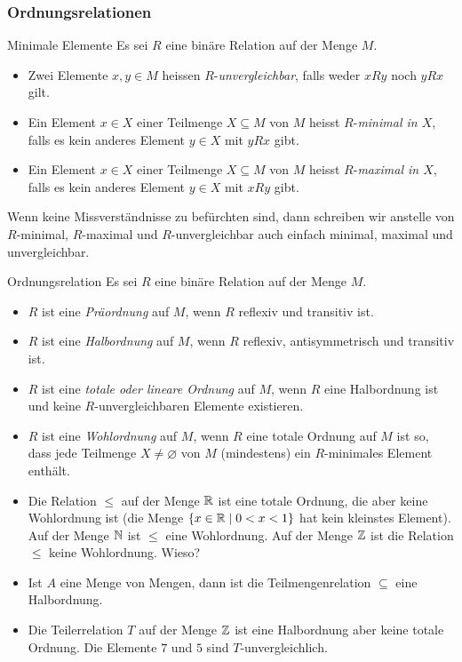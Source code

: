 \subsubsection{Ordnungsrelationen}

\begin{definition}{Minimale Elemente}
    Es sei $R$ eine binäre Relation auf der Menge $M$.
    \begin{itemize}
        \item Zwei Elemente $x,y\in M$ heissen $R$-\textit{unvergleichbar}, falls weder $xRy$ noch $yRx$ gilt.
        \item Ein Element $x\in X$ einer Teilmenge $X\subseteq M$ von $M$ heisst $R$-\textit{minimal in $X$}, falls es kein anderes Element $y\in X$ mit $yRx$ gibt.
        \item  Ein Element $x\in X$ einer Teilmenge $X\subseteq M$ von $M$ heisst $R$-\textit{maximal in $X$}, falls es kein anderes Element $y\in X$ mit $xRy$ gibt.
    \end{itemize}
    Wenn keine Missverständnisse zu befürchten sind, dann schreiben wir anstelle von $R$-minimal, $R$-maximal und $R$-unvergleichbar auch einfach minimal, maximal und unvergleichbar.
\end{definition}

\begin{definition}{Ordnungsrelation}
    Es sei $R$ eine binäre Relation auf der Menge $M$.
    \begin{itemize}
        \item $R$ ist eine \textit{Präordnung} auf $M$, wenn $R$ reflexiv und transitiv ist.
        \item $R$ ist eine \textit{Halbordnung} auf $M$, wenn $R$ reflexiv, antisymmetrisch und transitiv ist.
        \item $R$ ist eine \textit{totale oder lineare Ordnung} auf $M$, wenn $R$ eine Halbordnung ist und keine $R$-unvergleichbaren Elemente existieren.
        \item $R$ ist eine \textit{Wohlordnung} auf $M$, wenn $R$ eine totale Ordnung auf $M$ ist so, dass jede Teilmenge $X\neq\varnothing$ von $M$ (mindestens) ein $R$-minimales Element enthält.
    \end{itemize}
\end{definition}

\begin{example}
    \begin{itemize}
        \item Die Relation $\leq$ auf der Menge $\mathbb{R}$ ist eine totale Ordnung, die aber keine Wohlordnung ist (die Menge $\{x\in\mathbb{R}\mid 0<x<1\}$ hat kein kleinstes Element). Auf der Menge $\mathbb{N}$ ist $\leq$ eine Wohlordnung. Auf der Menge $\mathbb{Z}$ ist die Relation $\leq$ keine Wohlordnung. Wieso?
        \item Ist $A$ eine Menge von Mengen, dann ist die Teilmengenrelation $\subseteq$ eine Halbordnung.
        \item Die Teilerrelation $T$ auf der Menge $\mathbb{Z}$ ist eine Halbordnung aber keine totale Ordnung. Die Elemente $7$ und $5$ sind $T$-unvergleichlich.
    \end{itemize}
\end{example}


